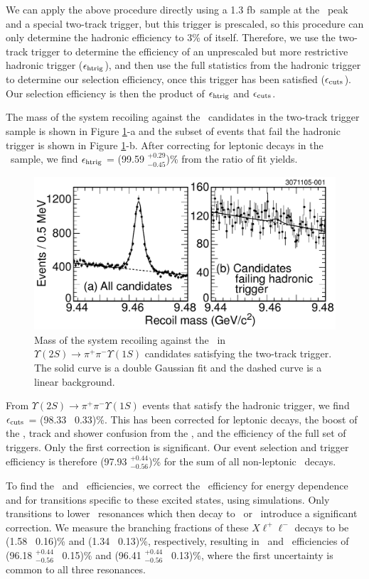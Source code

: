 \documentclass[aps,prl,superscriptaddress,showpacs,floatfix]{revtex4}
\begin{document}
We can apply the above procedure directly using a 1.3 fb\inv\ sample
at the \uss\ peak and a special two-track trigger, but this trigger is
prescaled, so this procedure can only determine the hadronic
efficiency to 3\% of itself.  Therefore, we use the two-track trigger
to determine the efficiency of an unprescaled but more restrictive
hadronic trigger ($\epsilon_{\mbox{\scriptsize htrig}}$), and then use the full statistics from
the hadronic trigger to determine our selection efficiency, once this
trigger has been satisfied ($\epsilon_{\mbox{\scriptsize cuts}}$).  Our selection efficiency is
then the product of $\epsilon_{\mbox{\scriptsize htrig}}$ and $\epsilon_{\mbox{\scriptsize cuts}}$.

The mass of the system recoiling against the \pipi\ candidates in the
two-track trigger sample is shown in Figure \ref{fig:cascades}-a and
the subset of events that fail the hadronic trigger is shown in Figure
\ref{fig:cascades}-b.  After correcting for leptonic decays in the
\us\ sample, we find $\epsilon_{\mbox{\scriptsize htrig}}$ = (99.59 $^{+0.29}_{-0.45}$)\% from the
ratio of fit yields.

\begin{figure}
  \includegraphics[width=0.5\linewidth]{cascades}
  \caption{\label{fig:cascades} Mass of the system recoiling against
the \pipi\ in $\Upsilon(2S) \to \pi^+\pi^- \Upsilon(1S)$ candidates
satisfying the two-track trigger.  The solid curve is a double
Gaussian fit and the dashed curve is a linear background.}
\end{figure}

From $\Upsilon(2S) \to \pi^+\pi^- \Upsilon(1S)$ events that satisfy
the hadronic trigger, we find $\epsilon_{\mbox{\scriptsize cuts}}$ = (98.33 \PM\ 0.33)\%.  This
has been corrected for leptonic decays, the boost of the \us, track
and shower confusion from the \pipi, and the efficiency of the full
set of triggers.  Only the first correction is significant.  Our event
selection and trigger efficiency is therefore (97.93
$^{+0.44}_{-0.56}$)\% for the sum of all non-leptonic \us\ decays.

To find the \uss\ and \usss\ efficiencies, we correct the \us\
efficiency for energy dependence and for transitions specific to these
excited states, using simulations.  Only transitions to lower \ups\
resonances which then decay to \ee\ or \mm\ introduce a significant
correction.  We measure the branching fractions of these
$X\ell^+\ell^-$ decays to be (1.58 \PM\ 0.16)\% and (1.34 \PM\
0.13)\%, respectively, resulting in \uss\ and \usss\ efficiencies of
(96.18 $^{+0.44}_{-0.56}$ \PM\ 0.15)\% and (96.41 $^{+0.44}_{-0.56}$
\PM\ 0.13)\%, where the first uncertainty is common to all three
resonances.
\end{document}
